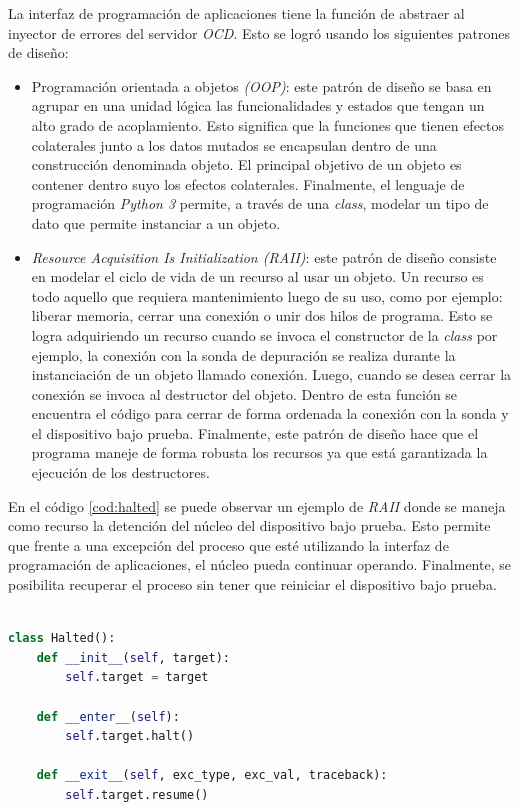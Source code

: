 La interfaz de programación de aplicaciones tiene la función de abstraer al inyector de errores del servidor \emph{OCD}.
Esto se logró usando los siguientes patrones de diseño:

\begin{itemize}
    \item Programación orientada a objetos \emph{(OOP)}: este patrón de diseño se basa en agrupar en una unidad lógica las funcionalidades y estados que tengan un alto grado de acoplamiento.
        Esto significa que la funciones que tienen efectos colaterales junto a los datos mutados se encapsulan dentro de una construcción denominada objeto.
        El principal objetivo de un objeto es contener dentro suyo los efectos colaterales.
        Finalmente, el lenguaje de programación \emph{Python 3} permite, a través de una \emph{class}, modelar un tipo de dato que permite instanciar a un objeto.
    \item \emph{Resource Acquisition Is Initialization (RAII)}: este patrón de diseño consiste en modelar el ciclo de vida de un recurso al usar un objeto.
        Un recurso es todo aquello que requiera mantenimiento luego de su uso, como por ejemplo: liberar memoria, cerrar una conexión o unir dos hilos de programa.
        Esto se logra adquiriendo un recurso cuando se invoca el constructor de la \emph{class} por ejemplo, la conexión con la sonda de depuración se realiza durante la instanciación de un objeto llamado conexión.
        Luego, cuando se desea cerrar la conexión se invoca al destructor del objeto.
        Dentro de esta función se encuentra el código para cerrar de forma ordenada la conexión con la sonda y el dispositivo bajo prueba.
        Finalmente, este patrón de diseño hace que el programa maneje de forma robusta los recursos ya que está garantizada la ejecución de los destructores.
\end{itemize}

En el código \ref{cod:halted} se puede observar un ejemplo de \emph{RAII} donde se maneja como recurso la detención del núcleo del dispositivo bajo prueba.
Esto permite que frente a una excepción del proceso que esté utilizando la interfaz de programación de aplicaciones, el núcleo pueda continuar operando.
Finalmente, se posibilita recuperar el proceso sin tener que reiniciar el dispositivo bajo prueba.

\begin{lstlisting}[language=Python,label=cod:halted,caption=Ejemplo de \emph{Resource Acquisition Is Initialization (RAII)}.]  % Start your code-block

class Halted():
    def __init__(self, target):
        self.target = target

    def __enter__(self):
        self.target.halt()

    def __exit__(self, exc_type, exc_val, traceback):
        self.target.resume()

\end{lstlisting}

